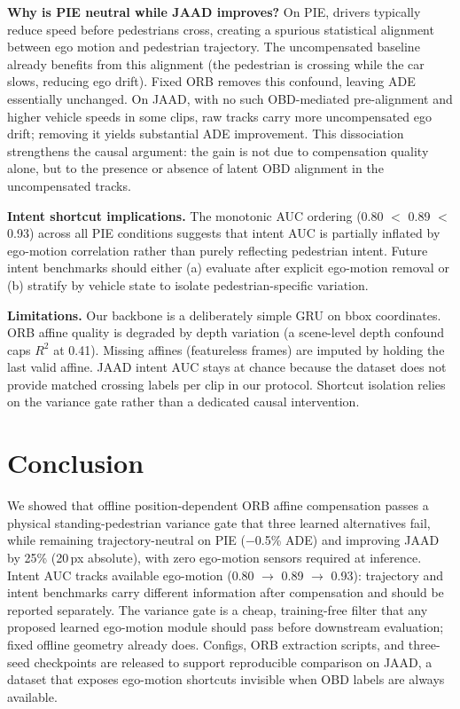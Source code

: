 \documentclass[conference]{IEEEtran}
\begin{document}
\textbf{Why is PIE neutral while JAAD improves?}
On PIE, drivers typically reduce speed before pedestrians cross, creating a spurious statistical alignment between ego motion and pedestrian trajectory.
The uncompensated baseline already benefits from this alignment (the pedestrian is crossing while the car slows, reducing ego drift).
Fixed ORB removes this confound, leaving ADE essentially unchanged.
On JAAD, with no such OBD-mediated pre-alignment and higher vehicle speeds in some clips, raw tracks carry more uncompensated ego drift; removing it yields substantial ADE improvement.
This dissociation strengthens the causal argument: the gain is not due to compensation quality alone, but to the presence or absence of latent OBD alignment in the uncompensated tracks.

\textbf{Intent shortcut implications.}
The monotonic AUC ordering (0.80 $<$ 0.89 $<$ 0.93) across all PIE conditions suggests that intent AUC is partially inflated by ego-motion correlation rather than purely reflecting pedestrian intent.
Future intent benchmarks should either (a) evaluate after explicit ego-motion removal or (b) stratify by vehicle state to isolate pedestrian-specific variation.

\textbf{Limitations.}
Our backbone is a deliberately simple GRU on bbox coordinates.
ORB affine quality is degraded by depth variation (a scene-level depth confound caps $R^2$ at 0.41).
Missing affines (featureless frames) are imputed by holding the last valid affine.
JAAD intent AUC stays at chance because the dataset does not provide matched crossing labels per clip in our protocol.
Shortcut isolation relies on the variance gate rather than a dedicated causal intervention.

\section{Conclusion}
\label{sec:conclusion}

We showed that offline position-dependent ORB affine compensation passes a physical standing-pedestrian variance gate that three learned alternatives fail, while remaining trajectory-neutral on PIE ($-$0.5\% ADE) and improving JAAD by 25\% (20\,px absolute), with zero ego-motion sensors required at inference.
Intent AUC tracks available ego-motion (0.80 $\rightarrow$ 0.89 $\rightarrow$ 0.93): trajectory and intent benchmarks carry different information after compensation and should be reported separately.
The variance gate is a cheap, training-free filter that any proposed learned ego-motion module should pass before downstream evaluation; fixed offline geometry already does.
Configs, ORB extraction scripts, and three-seed checkpoints are released to support reproducible comparison on JAAD, a dataset that exposes ego-motion shortcuts invisible when OBD labels are always available.



\end{document}
